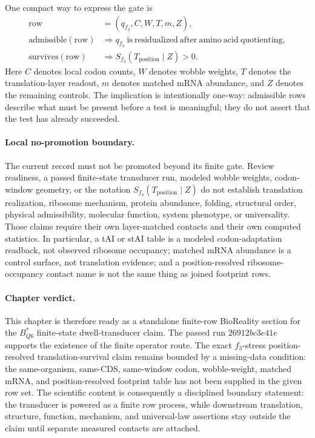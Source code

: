 One compact way to express the gate is
$$
\begin{aligned}
\mathrm{row} &= (q_{f_3}, C, W, T, m, Z),\\
\mathrm{admissible}(\mathrm{row}) &\Rightarrow q_{f_3}\ \mathrm{is\ residualized\ after\ amino\ acid\ quotienting},\\
\mathrm{survives}(\mathrm{row}) &\Rightarrow S_{f_3}(T_{\mathrm{position}}\mid Z)>0.
\end{aligned}
$$
Here $C$ denotes local codon counts, $W$ denotes wobble weights, $T$ denotes the translation-layer readout, $m$ denotes matched mRNA abundance, and $Z$ denotes the remaining controls. The implication is intentionally one-way: admissible rows describe what must be present before a test is meaningful; they do not assert that the test has already succeeded.

\paragraph{Local no-promotion boundary.} The current record must not be promoted beyond its finite gate. Review readiness, a passed finite-state transducer run, modeled wobble weights, codon-window geometry, or the notation $S_{f_3}(T_{\mathrm{position}}\mid Z)$ do not establish translation realization, ribosome mechanism, protein abundance, folding, structural order, physical admissibility, molecular function, system phenotype, or universality. Those claims require their own layer-matched contacts and their own computed statistics. In particular, a tAI or stAI table is a modeled codon-adaptation readback, not observed ribosome occupancy; matched mRNA abundance is a control surface, not translation evidence; and a position-resolved ribosome-occupancy contact name is not the same thing as joined footprint rows.

\paragraph{Chapter verdict.} This chapter is therefore ready as a standalone finite-row BioReality section for the $B^*_{Q6}$ finite-state dwell-transducer claim. The passed run $26912bc3e41e$ supports the existence of the finite operator route. The exact $f_3$-stress position-resolved translation-survival claim remains bounded by a missing-data condition: the same-organism, same-CDS, same-window codon, wobble-weight, matched mRNA, and position-resolved footprint table has not been supplied in the given row set. The scientific content is consequently a disciplined boundary statement: the transducer is powered as a finite row process, while downstream translation, structure, function, mechanism, and universal-law assertions stay outside the claim until separate measured contacts are attached.